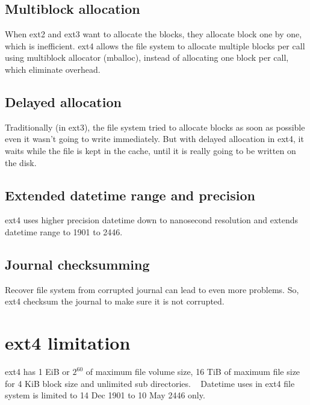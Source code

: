 \documentclass[11pt,a4paper]{article}
\begin{document}
\subsection{Multiblock allocation}

When ext2 and ext3 want to allocate the blocks, they allocate block one by one, which is inefficient. ext4 allows the file system to allocate multiple blocks per call using multiblock allocator (mballoc), instead of allocating one block per call, which eliminate overhead. ~\cite{Ext4HowtoWiki}

\subsection{Delayed allocation}

Traditionally (in ext3), the file system tried to allocate blocks as soon as possible even it wasn’t going to write immediately. But with delayed allocation in ext4, it waits while the file is kept in the cache, until it is really going to be written on the disk. ~\cite{Ext4HowtoWiki}

\subsection{Extended datetime range and precision}

ext4 uses higher precision datetime down to nanosecond resolution and extends datetime range to 1901 to 2446. ~\cite{wiki:Ext4, opensource:intro_to_ext4fs}

\subsection{Journal checksumming}

Recover file system from corrupted journal can lead to even more problems. So, ext4 checksum the journal to make sure it is not corrupted.~\cite{Ext4HowtoWiki}

\section{ext4 limitation}

ext4 has 1 EiB or $2^{60}$ of maximum file volume size, 16 TiB of maximum file size for 4 KiB block size and unlimited sub directories. ~\cite{Ext4HowtoWiki, wiki:Ext4}
Datetime uses in ext4 file system is limited to 14 Dec 1901 to 10 May 2446 only. ~\cite{wiki:Ext4}




\appendix
\end{document}
